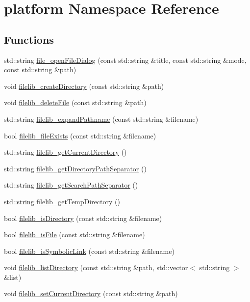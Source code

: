 \hypertarget{namespaceplatform}{}\section{platform Namespace Reference}
\label{namespaceplatform}
\subsection*{Functions}
\begin{DoxyCompactItemize}
\item 
std\+::string \mbox{\hyperlink{namespaceplatform_aa812fb80e0cb15f75d35975ea91e8f2b}{file\+\_\+open\+File\+Dialog}} (const std\+::string \&title, const std\+::string \&mode, const std\+::string \&path)
\item 
void \mbox{\hyperlink{namespaceplatform_aa30655cd42c277a7c5ed7aba21cf0050}{filelib\+\_\+create\+Directory}} (const std\+::string \&path)
\item 
void \mbox{\hyperlink{namespaceplatform_a50db655854102498e7bbc1d5f409a29f}{filelib\+\_\+delete\+File}} (const std\+::string \&path)
\item 
std\+::string \mbox{\hyperlink{namespaceplatform_a7aec69b6d9120eefca74eeba8f7eb02d}{filelib\+\_\+expand\+Pathname}} (const std\+::string \&filename)
\item 
bool \mbox{\hyperlink{namespaceplatform_a7ac56ce70edb176e3d75d83732517d85}{filelib\+\_\+file\+Exists}} (const std\+::string \&filename)
\item 
std\+::string \mbox{\hyperlink{namespaceplatform_a52fd33354355f61a96ea88ac33aaa11a}{filelib\+\_\+get\+Current\+Directory}} ()
\item 
std\+::string \mbox{\hyperlink{namespaceplatform_abf9418d14665b0404fd9a942cd890151}{filelib\+\_\+get\+Directory\+Path\+Separator}} ()
\item 
std\+::string \mbox{\hyperlink{namespaceplatform_a9641200cba6781202640c6b723341af2}{filelib\+\_\+get\+Search\+Path\+Separator}} ()
\item 
std\+::string \mbox{\hyperlink{namespaceplatform_a969c5e3fc13cd635656eba2845bc932e}{filelib\+\_\+get\+Temp\+Directory}} ()
\item 
bool \mbox{\hyperlink{namespaceplatform_a68319ac7586223f385d7785f1b38e1b9}{filelib\+\_\+is\+Directory}} (const std\+::string \&filename)
\item 
bool \mbox{\hyperlink{namespaceplatform_aca0d9e2b4896bfd0f7a5cd64049188fc}{filelib\+\_\+is\+File}} (const std\+::string \&filename)
\item 
bool \mbox{\hyperlink{namespaceplatform_a69dc63b6fb991650c05dde15b04ca465}{filelib\+\_\+is\+Symbolic\+Link}} (const std\+::string \&filename)
\item 
void \mbox{\hyperlink{namespaceplatform_acad9142fb05b5756d75b8f8a68b5558b}{filelib\+\_\+list\+Directory}} (const std\+::string \&path, std\+::vector$<$ std\+::string $>$ \&list)
\item 
void \mbox{\hyperlink{namespaceplatform_afe79a966d14e3b8d08939712884fa9d3}{filelib\+\_\+set\+Current\+Directory}} (const std\+::string \&path)
\end{DoxyCompactItemize}



